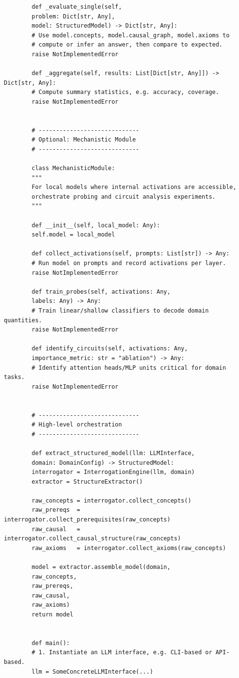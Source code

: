 \documentclass[11pt]{article}
\begin{document}
\begin{verbatim}
		def _evaluate_single(self,
		problem: Dict[str, Any],
		model: StructuredModel) -> Dict[str, Any]:
		# Use model.concepts, model.causal_graph, model.axioms to
		# compute or infer an answer, then compare to expected.
		raise NotImplementedError
		
		def _aggregate(self, results: List[Dict[str, Any]]) -> Dict[str, Any]:
		# Compute summary statistics, e.g. accuracy, coverage.
		raise NotImplementedError
		
		
		# -----------------------------
		# Optional: Mechanistic Module
		# -----------------------------
		
		class MechanisticModule:
		"""
		For local models where internal activations are accessible,
		orchestrate probing and circuit analysis experiments.
		"""
		
		def __init__(self, local_model: Any):
		self.model = local_model
		
		def collect_activations(self, prompts: List[str]) -> Any:
		# Run model on prompts and record activations per layer.
		raise NotImplementedError
		
		def train_probes(self, activations: Any,
		labels: Any) -> Any:
		# Train linear/shallow classifiers to decode domain quantities.
		raise NotImplementedError
		
		def identify_circuits(self, activations: Any,
		importance_metric: str = "ablation") -> Any:
		# Identify attention heads/MLP units critical for domain tasks.
		raise NotImplementedError
		
		
		# -----------------------------
		# High-level orchestration
		# -----------------------------
		
		def extract_structured_model(llm: LLMInterface,
		domain: DomainConfig) -> StructuredModel:
		interrogator = InterrogationEngine(llm, domain)
		extractor = StructureExtractor()
		
		raw_concepts = interrogator.collect_concepts()
		raw_prereqs  = interrogator.collect_prerequisites(raw_concepts)
		raw_causal   = interrogator.collect_causal_structure(raw_concepts)
		raw_axioms   = interrogator.collect_axioms(raw_concepts)
		
		model = extractor.assemble_model(domain,
		raw_concepts,
		raw_prereqs,
		raw_causal,
		raw_axioms)
		return model
		
		
		def main():
		# 1. Instantiate an LLM interface, e.g. CLI-based or API-based.
		llm = SomeConcreteLLMInterface(...)
		

\end{verbatim}
\end{document}
